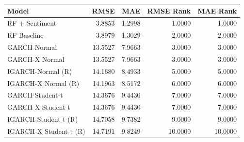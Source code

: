 \begin{tabular}{lrrrr}
\toprule
Model & RMSE & MAE & RMSE Rank & MAE Rank \\
\midrule
RF + Sentiment & 3.8853 & 1.2998 & 1.0000 & 1.0000 \\
RF Baseline & 3.8979 & 1.3029 & 2.0000 & 2.0000 \\
GARCH-Normal & 13.5527 & 7.9663 & 3.0000 & 3.0000 \\
GARCH-X Normal & 13.5527 & 7.9663 & 3.0000 & 3.0000 \\
IGARCH-Normal (R) & 14.1680 & 8.4933 & 5.0000 & 5.0000 \\
IGARCH-X Normal (R) & 14.1963 & 8.5172 & 6.0000 & 6.0000 \\
GARCH-Student-t & 14.3676 & 9.4430 & 7.0000 & 7.0000 \\
GARCH-X Student-t & 14.3676 & 9.4430 & 7.0000 & 7.0000 \\
IGARCH-Student-t (R) & 14.7058 & 9.7382 & 9.0000 & 9.0000 \\
IGARCH-X Student-t (R) & 14.7191 & 9.8249 & 10.0000 & 10.0000 \\
\bottomrule
\end{tabular}
